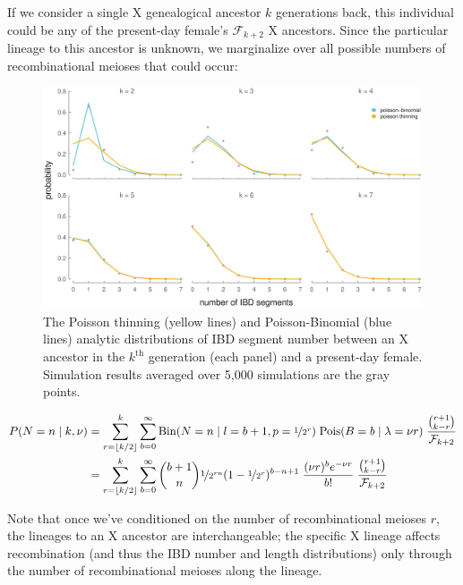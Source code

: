 \documentclass[11pt]{article}
\begin{document}
If we consider a single X genealogical ancestor $k$ generations back, this
individual could be any of the present-day female's $\mathcal{F}_{k+2}$ X
ancestors. Since the particular lineage to this ancestor is unknown, we
marginalize over all possible numbers of recombinational meioses that could
occur:

\begin{figure}[!ht]
  \centering
  \includegraphics[width=\textwidth]{images/x-ancestor-blockcounts}

  \caption{The Poisson thinning (yellow lines) and Poisson-Binomial (blue
  lines) analytic distributions of IBD segment number between an X ancestor in
the $k^\text{th}$ generation (each panel) and a present-day female. Simulation
results averaged over 5,000 simulations are the gray points.}

  \label{fig:x-ancestor-blockcounts}

\end{figure}

\begin{align}
  P(N=n \;|\; k, \nu) &= \sum_{r=\lfloor k/2 \rfloor}^k \sum_{b=0}^\infty \text{Bin}(N=n \;|\; l=b+1, p=\nicefrac{1}{2^r}) \; \text{Pois}(B=b \;|\; \lambda=\nu r) \; \frac{{r+1 \choose k-r}}{\mathcal{F}_{k+2}} \nonumber \\
                      &= \sum_{r=\lfloor k/2 \rfloor}^k \sum_{b=0}^\infty {b + 1 \choose n } \nicefrac{1}{2^{rn}}(1 - \nicefrac{1}{2^r})^{b - n + 1} \; \frac{(\nu r)^b e^{-\nu r}}{b!} \; \frac{{r+1 \choose k-r}}{\mathcal{F}_{k+2}}
\end{align}

Note that once we've conditioned on the number of recombinational meioses $r$,
the lineages to an X ancestor are interchangeable; the specific X lineage
affects recombination (and thus the IBD number and length distributions) only
through the number of recombinational meioses along the lineage.
\end{document}
